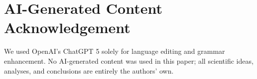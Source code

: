 \documentclass[conference]{IEEEtran}
\begin{document}
\section*{AI-Generated Content Acknowledgement}
We used OpenAI’s ChatGPT 5 solely for language editing and grammar enhancement. No AI-generated content was used in this paper; all scientific ideas, analyses, and conclusions are entirely the authors’ own.
\end{document}
